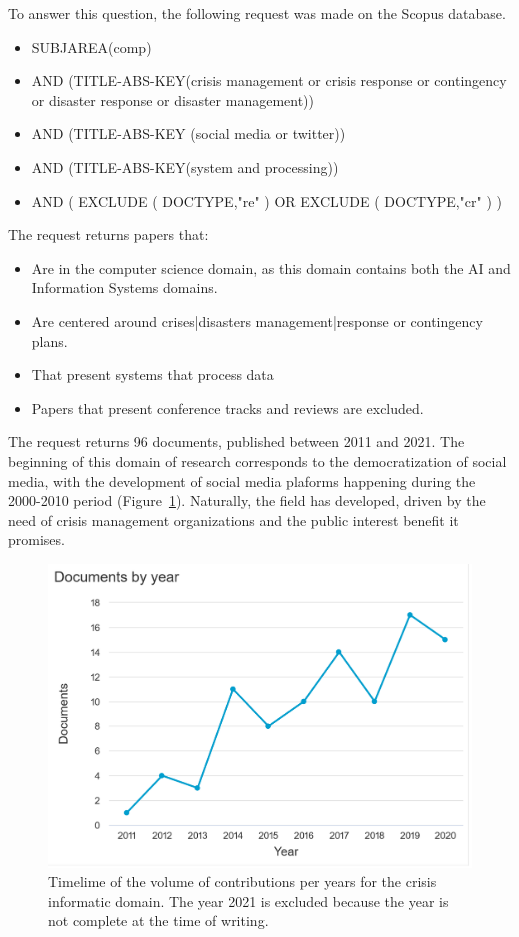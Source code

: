 To answer this question, the following request was made on the Scopus database.
\begin{itemize}
    \item SUBJAREA(comp)
    \item AND (TITLE-ABS-KEY({crisis management} or {crisis response} or contingency or {disaster response} or {disaster management}))
    \item AND (TITLE-ABS-KEY ({social media} or twitter))
    \item AND (TITLE-ABS-KEY(system and processing))
    \item AND ( EXCLUDE ( DOCTYPE,"re" ) OR EXCLUDE ( DOCTYPE,"cr" ) )
\end{itemize}

The request returns papers that:
\begin{itemize}
    \item Are in the computer science domain, as this domain contains both the AI and Information Systems domains.
    \item Are centered around crises|disasters management|response or contingency plans.
    \item That present systems that process data
    \item Papers that present conference tracks and reviews are excluded.
\end{itemize}

The request returns 96 documents, published between 2011 and 2021.
The beginning of this domain of research corresponds to the democratization of social media, with the development of social media plaforms happening during the 2000-2010 period (Figure~\ref{literature:crisis-informatic-hist}).
Naturally, the field has developed, driven by the need of crisis management organizations and the public interest benefit it promises.

\begin{figure}[bp]
    \centering
    \includegraphics[width=\textwidth]{figures/chap-2/crisis-informatic-hist.pdf}
    \caption{Timelime of the volume of contributions per years for the crisis informatic domain. The year 2021 is excluded because the year is not complete at the time of writing.}
    \label{literature:crisis-informatic-hist}
\end{figure}

